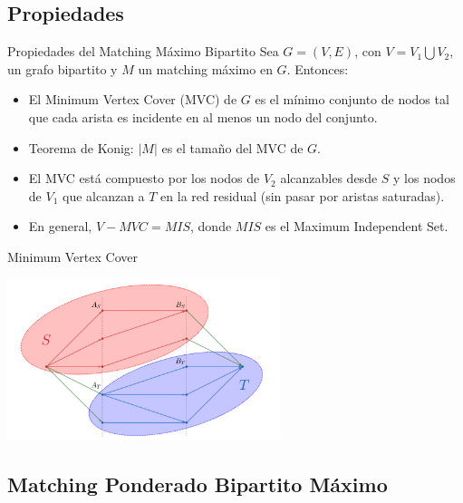 \documentclass{beamer}
\begin{document}
\subsection{ Propiedades }

\begin{frame}{Propiedades del Matching Máximo Bipartito}
    Sea $G=(V,E)$, con $V = V_1 \bigcup V_2$, un grafo bipartito y $M$ un matching máximo en $G$. Entonces:
    
    \begin{itemize}
        \item El Minimum Vertex Cover (MVC) de $G$ es el mínimo conjunto de nodos tal que cada arista es incidente en al menos un nodo del conjunto.
        \pause
        \item Teorema de Konig: $|M|$ es el tamaño del MVC de $G$.
        \pause
        \item El MVC está compuesto por los nodos de $V_2$ alcanzables desde $S$ y los nodos de $V_1$ que alcanzan a $T$ en la red residual (sin pasar por aristas saturadas).
        \pause
        \item En general, $V - MVC = MIS$, donde $MIS$ es el Maximum Independent Set.
    \end{itemize}
\end{frame}
    
\begin{frame}{Minimum Vertex Cover}

    \begin{center}
        \includegraphics[width=0.6\textwidth]{imgs/mvc.png}
    \end{center}
\end{frame}
\subsection{ Matching Ponderado Bipartito Máximo }
\end{document}
